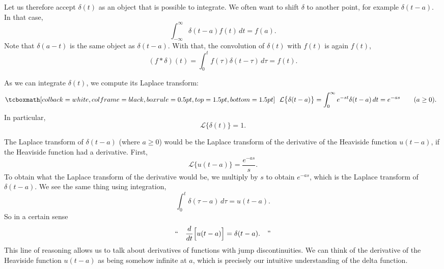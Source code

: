 Let us therefore accept $\delta(t)$ as an object that is possible to
integrate.  We often want to shift $\delta$ to another point, for example
$\delta(t-a)$.  In that case,
\begin{equation*}
\int_{-\infty}^\infty \delta(t-a) f(t) \,dt = f(a) .
\end{equation*}
Note that $\delta(a-t)$ is the same object as $\delta(t-a)$.
With that, the convolution of $\delta(t)$ with $f(t)$ is again $f(t)$,
\begin{equation*}
(f * \delta) (t) = 
\int_{0}^t f(\tau) \delta(t-\tau) \,d\tau
= f(t) .
\end{equation*}

As we can integrate $\delta(t)$, we compute its Laplace transform:
\begin{equation*}
\mybxbg{~~
{\mathcal{L}} \bigl\{ \delta(t-a) \bigr\}
=
\int_{0}^\infty e^{-st} \delta(t-a) \,dt = e^{-as}
\qquad (a \geq 0).
~~}
\end{equation*}
In particular,
\begin{equation*}
{\mathcal{L}} \bigl\{ \delta(t) \bigr\} = 1 .
\end{equation*}

\begin{remark} \label{remark:deltaderivofjump}
The Laplace transform of $\delta(t-a)$ (where $a \geq 0$) would be 
the Laplace transform of the derivative of the Heaviside function
$u(t-a)$, if the Heaviside function had a derivative.
First,
\begin{equation*}
{\mathcal{L}} \bigl\{ u(t-a) \bigr\} = \frac{e^{-as}}{s}.
\end{equation*}
To obtain what the Laplace transform of the derivative would be,
we multiply by $s$ to obtain $e^{-as}$, which is the Laplace transform
of $\delta(t-a)$.
We see the same thing using integration,
\begin{equation*}
\int_0^t \delta(\tau-a)\,d\tau = u(t-a) .
\end{equation*}
So in a certain sense
\begin{equation*}
\text{``}
\quad \frac{d}{dt} \Bigl[ u(t-a) \Bigr] = \delta(t-a) . \quad
\text{''}
\end{equation*}
This line of reasoning allows us to talk about derivatives of functions with jump
discontinuities.
We can think of
the derivative of the Heaviside function $u(t-a)$ as being somehow infinite
at $a$, which is precisely our intuitive understanding of the delta
function.
\end{remark}

